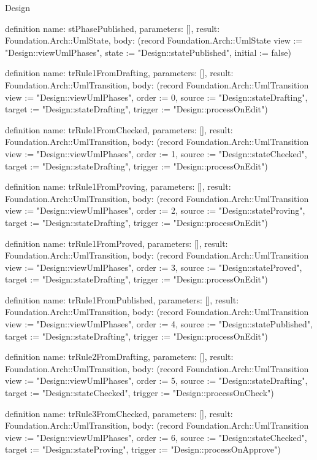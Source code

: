 \begin{lexlean}{Design}
\begin{semanticmodule}
definition{
  name: stPhasePublished,
  parameters: [],
  result: Foundation.Arch::UmlState,
  body: (record Foundation.Arch::UmlState {view := "Design::viewUmlPhases", state := "Design::statePublished", initial := false})
}

definition{
  name: trRule1FromDrafting,
  parameters: [],
  result: Foundation.Arch::UmlTransition,
  body: (record Foundation.Arch::UmlTransition {view := "Design::viewUmlPhases", order := 0, source := "Design::stateDrafting", target := "Design::stateDrafting", trigger := "Design::processOnEdit"})
}

definition{
  name: trRule1FromChecked,
  parameters: [],
  result: Foundation.Arch::UmlTransition,
  body: (record Foundation.Arch::UmlTransition {view := "Design::viewUmlPhases", order := 1, source := "Design::stateChecked", target := "Design::stateDrafting", trigger := "Design::processOnEdit"})
}

definition{
  name: trRule1FromProving,
  parameters: [],
  result: Foundation.Arch::UmlTransition,
  body: (record Foundation.Arch::UmlTransition {view := "Design::viewUmlPhases", order := 2, source := "Design::stateProving", target := "Design::stateDrafting", trigger := "Design::processOnEdit"})
}

definition{
  name: trRule1FromProved,
  parameters: [],
  result: Foundation.Arch::UmlTransition,
  body: (record Foundation.Arch::UmlTransition {view := "Design::viewUmlPhases", order := 3, source := "Design::stateProved", target := "Design::stateDrafting", trigger := "Design::processOnEdit"})
}

definition{
  name: trRule1FromPublished,
  parameters: [],
  result: Foundation.Arch::UmlTransition,
  body: (record Foundation.Arch::UmlTransition {view := "Design::viewUmlPhases", order := 4, source := "Design::statePublished", target := "Design::stateDrafting", trigger := "Design::processOnEdit"})
}

definition{
  name: trRule2FromDrafting,
  parameters: [],
  result: Foundation.Arch::UmlTransition,
  body: (record Foundation.Arch::UmlTransition {view := "Design::viewUmlPhases", order := 5, source := "Design::stateDrafting", target := "Design::stateChecked", trigger := "Design::processOnCheck"})
}

definition{
  name: trRule3FromChecked,
  parameters: [],
  result: Foundation.Arch::UmlTransition,
  body: (record Foundation.Arch::UmlTransition {view := "Design::viewUmlPhases", order := 6, source := "Design::stateChecked", target := "Design::stateProving", trigger := "Design::processOnApprove"})
}


\end{semanticmodule}
\end{lexlean}

